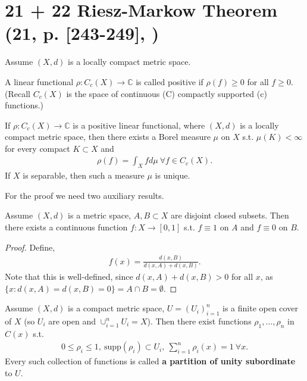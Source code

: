 \setcounter{section}{21}
\setcounter{theorem}{21}
\section*{21 + 22 Riesz-Markow Theorem \tiny(21, p. [243-249], \cite{schilling2017measures})}
Assume \((X,d)\) is a locally compact metric space. 
\begin{definition}
    A linear functional \(\rho:C_c(X)\rightarrow\mathbb{C}\) is called positive if \(\rho(f)\geq0\) for all \(f\geq0\). (Recall \(C_c(X)\) is the space of continuous (C) compactly supported (c) functions.)
\end{definition}
\begin{theorem}
    If \(\rho:C_c(X)\rightarrow \mathbb{C}\) is a positive linear functional, where \((X,d)\) is a locally compact metric space, then there exists a Borel measure \(\mu\) on \(X\) s.t. \(\mu(K)<\infty\) for every compact \(K\subset X\) and
    \begin{align*}
        \rho(f) = \int_X f d\mu \ \forall f\in C_c(X).
    \end{align*}
    If \(X\) is separable, then such a measure \(\mu\) is unique. 
\end{theorem}
For the proof we need two auxiliary results.
\begin{lemma}
    Assume \((X,d)\) is a metric space, \(A,B\subset X\) are disjoint closed subsets. Then there exists a continuous function \(f:X\rightarrow[0,1]\) s.t. \(f\equiv1\) on \(A\) and \(f\equiv0\) on \(B\).
\end{lemma}
\ifdetailed
\begin{proof}
    Define,
    \begin{align*}
        f(x) = \frac{d(x,B)}{d(x,A)+d(x,B)}.
    \end{align*}
    Note that this is well-defined, since
    \(d(x,A) + d(x,B)>0\) for all \(x\), as \(\{x:d(x,A)=d(x,B)=0\} = A\cap B = \emptyset\).
\end{proof}
\fi
\begin{lemma}
    Assume \((X,d)\) is a compact metric space, \(U=(U_i)_{i=1}^{n}\) is a finite open cover of \(X\) (so \(U_i\) are open and \(\cup_{i=1}^{n}U_i = X\)). Then there exist functions \(\rho_1, ..., \rho_n\) in \(C(x)\) s.t.
    \begin{align*}
        0\leq \rho_i\leq 1, \ \text{supp}(\rho_i)\subset U_i, \ \sum\limits_{i=1}^{n}\rho_i(x)=1 \ \forall x.
    \end{align*}
    Every such collection of functions is called \textbf{a partition of unity subordinate} to \(U\).
\end{lemma}

